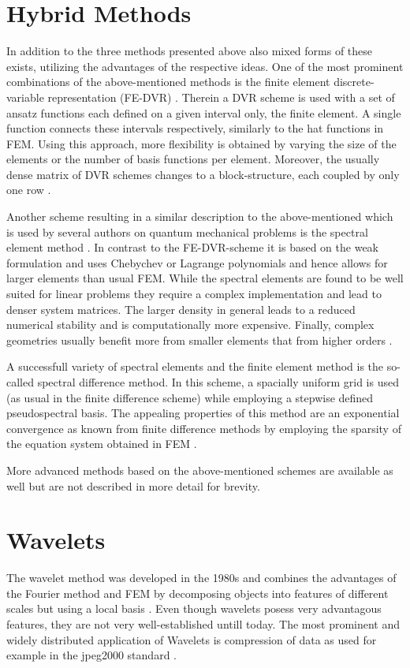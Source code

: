 \section{Hybrid Methods}
In addition to the three methods presented above also mixed forms of these exists, utilizing the advantages of the respective ideas.
One of the most prominent combinations of the above-mentioned methods is the finite element discrete-variable representation (FE-DVR) \cite{impLDVR,taoDVR}.
Therein a DVR scheme is used with a set of ansatz functions each defined on a given interval only, the finite element.
A single function connects these intervals respectively, similarly to the hat functions in FEM.
Using this approach, more flexibility is obtained by varying the size of the elements or the number of basis functions per element.
Moreover, the usually dense matrix of DVR schemes changes to a block-structure, each coupled by only one row \cite{taoDVR}.

Another scheme resulting in a similar description to the above-mentioned which is used by several authors on quantum mechanical problems is the spectral element method \cite{sem1}.
In contrast to the FE-DVR-scheme it is based on the weak formulation and uses Chebychev or Lagrange polynomials and hence allows for larger elements than usual FEM.
While the spectral elements are found to be well suited for linear problems they require a complex implementation and lead to denser system matrices.
The larger density in general leads to a reduced numerical stability and is computationally more expensive.
Finally, complex geometries usually benefit more from smaller elements that from higher orders \cite{hf_dreyer}.

A successfull variety of spectral elements and the finite element method is the so-called spectral difference method.
In this scheme, a spacially uniform grid is used (as usual in the finite difference scheme) while employing a stepwise defined pseudospectral basis.
The appealing properties of this method are an exponential convergence as known from finite difference methods by employing the sparsity of the equation system obtained in FEM \cite{SpectDiff}.

More advanced methods based on the above-mentioned schemes are available as well \cite{sd_mult,sd_unstructured} but are not described in more detail for brevity.

\section{Wavelets}
\label{ch:wavelet}
The wavelet method was developed in the 1980s \cite{waveletLA} and combines the advantages of the Fourier method and FEM by decomposing objects into features of different scales but using a local basis \cite{waveletLA, dahlke, FdFeWavelet}.
Even though wavelets posess very advantagous features, they are not very well-established untill today.
The most prominent and widely distributed application of Wavelets is compression of data as used for example in the jpeg2000 standard \cite{iso15444}.

